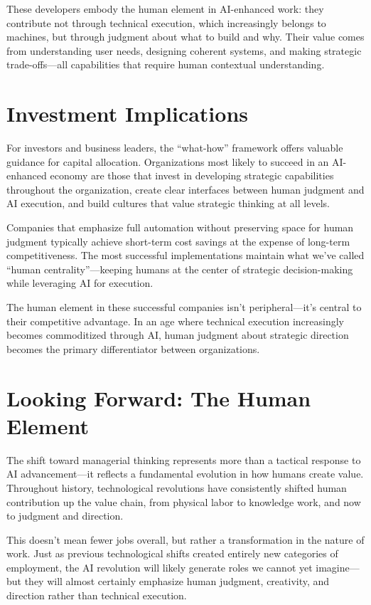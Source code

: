 \documentclass[
  Letterpaper,
]{scrbook}
\begin{document}
These developers embody the human element in AI-enhanced work: they
contribute not through technical execution, which increasingly belongs
to machines, but through judgment about what to build and why. Their
value comes from understanding user needs, designing coherent systems,
and making strategic trade-offs---all capabilities that require human
contextual understanding.

\section{Investment Implications}\label{investment-implications-4}

For investors and business leaders, the ``what-how'' framework offers
valuable guidance for capital allocation. Organizations most likely to
succeed in an AI-enhanced economy are those that invest in developing
strategic capabilities throughout the organization, create clear
interfaces between human judgment and AI execution, and build cultures
that value strategic thinking at all levels.

Companies that emphasize full automation without preserving space for
human judgment typically achieve short-term cost savings at the expense
of long-term competitiveness. The most successful implementations
maintain what we've called ``human centrality''---keeping humans at the
center of strategic decision-making while leveraging AI for execution.

The human element in these successful companies isn't peripheral---it's
central to their competitive advantage. In an age where technical
execution increasingly becomes commoditized through AI, human judgment
about strategic direction becomes the primary differentiator between
organizations.

\section{Looking Forward: The Human
Element}\label{looking-forward-the-human-element}

The shift toward managerial thinking represents more than a tactical
response to AI advancement---it reflects a fundamental evolution in how
humans create value. Throughout history, technological revolutions have
consistently shifted human contribution up the value chain, from
physical labor to knowledge work, and now to judgment and direction.

This doesn't mean fewer jobs overall, but rather a transformation in the
nature of work. Just as previous technological shifts created entirely
new categories of employment, the AI revolution will likely generate
roles we cannot yet imagine---but they will almost certainly emphasize
human judgment, creativity, and direction rather than technical
execution.
\end{document}
